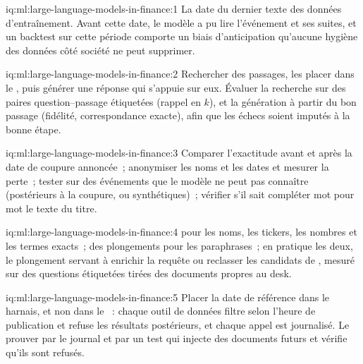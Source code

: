 \begin{solution}{iq:ml:large-language-models-in-finance:1}
La date du dernier texte des données d'entraînement. Avant cette date, le modèle a pu lire l'événement et ses suites, et un
backtest sur cette période comporte un biais d'anticipation qu'aucune hygiène des données côté société ne peut supprimer.
\end{solution}

\begin{solution}{iq:ml:large-language-models-in-finance:2}
Rechercher des passages, les placer dans le , puis générer une réponse qui s'appuie sur eux. Évaluer la recherche sur des
paires question--passage étiquetées (rappel en $k$), et la génération à partir du bon passage (fidélité, correspondance exacte), afin que
les échecs soient imputés à la bonne étape.
\end{solution}

\begin{solution}{iq:ml:large-language-models-in-finance:3}
Comparer l'exactitude avant et après la date de coupure annoncée~; anonymiser les noms et les dates et mesurer la perte~; tester sur des
événements que le modèle ne peut pas connaître (postérieurs à la coupure, ou synthétiques)~; vérifier s'il sait compléter mot pour mot le texte du titre.
\end{solution}

\begin{solution}{iq:ml:large-language-models-in-finance:4}
 pour les noms, les tickers, les nombres et les termes exacts~; des plongements pour les paraphrases~; en pratique les deux, le plongement servant à
enrichir la requête ou reclasser les candidats de , mesuré sur des questions étiquetées tirées des documents propres au desk.
\end{solution}

\begin{solution}{iq:ml:large-language-models-in-finance:5}
Placer la date de référence dans le harnais, et non dans le ~: chaque outil de données filtre selon l'heure de publication et refuse les
résultats postérieurs, et chaque appel est journalisé. Le prouver par le journal et par un test qui injecte des documents futurs et vérifie qu'ils sont refusés.
\end{solution}


